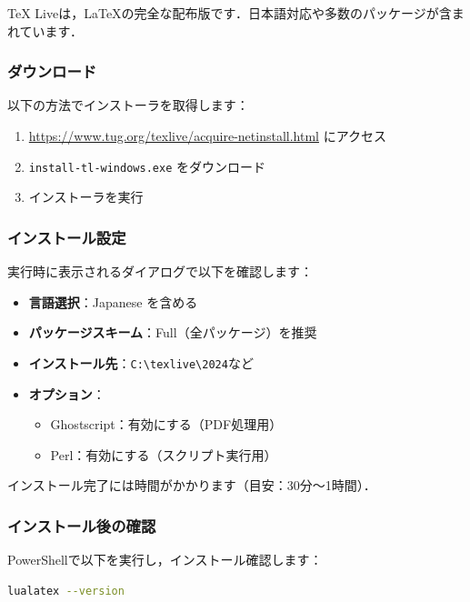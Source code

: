 \documentclass[11pt]{ltjarticle}
\begin{document}
TeX Liveは，LaTeXの完全な配布版です．日本語対応や多数のパッケージが含まれています．

\subsubsection{ダウンロード}

以下の方法でインストーラを取得します：

\begin{enumerate}
  \item \url{https://www.tug.org/texlive/acquire-netinstall.html} にアクセス
  \item \texttt{install-tl-windows.exe} をダウンロード
  \item インストーラを実行
\end{enumerate}

\subsubsection{インストール設定}

実行時に表示されるダイアログで以下を確認します：

\begin{itemize}
  \item \textbf{言語選択}：Japanese を含める
  \item \textbf{パッケージスキーム}：Full（全パッケージ）を推奨
  \item \textbf{インストール先}：\texttt{C:\textbackslash texlive\textbackslash 2024}など
  \item \textbf{オプション}：
    \begin{itemize}
      \item Ghostscript：有効にする（PDF処理用）
      \item Perl：有効にする（スクリプト実行用）
    \end{itemize}
\end{itemize}

インストール完了には時間がかかります（目安：30分～1時間）．

\subsubsection{インストール後の確認}

PowerShellで以下を実行し，インストール確認します：

\begin{lstlisting}[language=bash]
lualatex --version
\end{lstlisting}
\end{document}
